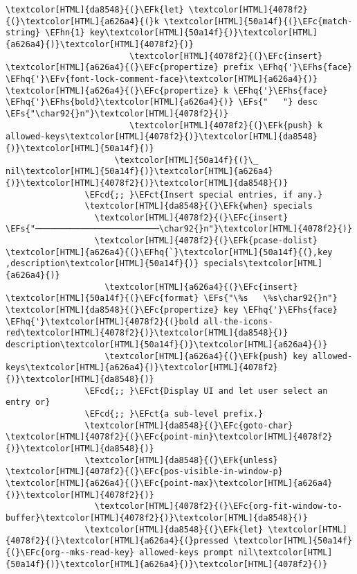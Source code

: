 \documentclass{scrartcl}
\newcommand{\EFk}[1]{\textcolor{EFk}{#1}} %
\newcommand{\EFs}[1]{\textcolor{EFs}{#1}} %
\newcommand{\EFct}[1]{\textcolor{EFct}{#1}} %
\newcommand{\EFc}[1]{\textcolor{EFc}{#1}} %
\newcommand{\EFv}[1]{\textcolor{EFv}{#1}} %
\newcommand{\EFcd}[1]{\textcolor{EFcd}{#1}} %
\newcommand{\EFhn}[1]{\textcolor{EFhn}{\textbf{#1}}} %
\newcommand{\EFhq}[1]{\textcolor{EFhq}{#1}} %
\newcommand{\EFhs}[1]{\textcolor{EFhs}{#1}} %
\begin{document}
\begin{Code}
\begin{Verbatim}[]
                       \textcolor[HTML]{da8548}{(}\EFk{let} \textcolor[HTML]{4078f2}{(}\textcolor[HTML]{a626a4}{(}k \textcolor[HTML]{50a14f}{(}\EFc{match-string} \EFhn{1} key\textcolor[HTML]{50a14f}{)}\textcolor[HTML]{a626a4}{)}\textcolor[HTML]{4078f2}{)}
                         \textcolor[HTML]{4078f2}{(}\EFc{insert} \textcolor[HTML]{a626a4}{(}\EFc{propertize} prefix \EFhq{'}\EFhs{face} \EFhq{'}\EFv{font-lock-comment-face}\textcolor[HTML]{a626a4}{)} \textcolor[HTML]{a626a4}{(}\EFc{propertize} k \EFhq{'}\EFhs{face} \EFhq{'}\EFhs{bold}\textcolor[HTML]{a626a4}{)} \EFs{"   "} desc \EFs{"\char92{}n"}\textcolor[HTML]{4078f2}{)}
                         \textcolor[HTML]{4078f2}{(}\EFk{push} k allowed-keys\textcolor[HTML]{4078f2}{)}\textcolor[HTML]{da8548}{)}\textcolor[HTML]{50a14f}{)}
                      \textcolor[HTML]{50a14f}{(}\_ nil\textcolor[HTML]{50a14f}{)}\textcolor[HTML]{a626a4}{)}\textcolor[HTML]{4078f2}{)}\textcolor[HTML]{da8548}{)}
                \EFcd{;; }\EFct{Insert special entries, if any.}
                \textcolor[HTML]{da8548}{(}\EFk{when} specials
                  \textcolor[HTML]{4078f2}{(}\EFc{insert} \EFs{"─────────────────────────\char92{}n"}\textcolor[HTML]{4078f2}{)}
                  \textcolor[HTML]{4078f2}{(}\EFk{pcase-dolist} \textcolor[HTML]{a626a4}{(}\EFhq{`}\textcolor[HTML]{50a14f}{(},key ,description\textcolor[HTML]{50a14f}{)} specials\textcolor[HTML]{a626a4}{)}
                    \textcolor[HTML]{a626a4}{(}\EFc{insert} \textcolor[HTML]{50a14f}{(}\EFc{format} \EFs{"\%s   \%s\char92{}n"} \textcolor[HTML]{da8548}{(}\EFc{propertize} key \EFhq{'}\EFhs{face} \EFhq{'}\textcolor[HTML]{4078f2}{(}bold all-the-icons-red\textcolor[HTML]{4078f2}{)}\textcolor[HTML]{da8548}{)} description\textcolor[HTML]{50a14f}{)}\textcolor[HTML]{a626a4}{)}
                    \textcolor[HTML]{a626a4}{(}\EFk{push} key allowed-keys\textcolor[HTML]{a626a4}{)}\textcolor[HTML]{4078f2}{)}\textcolor[HTML]{da8548}{)}
                \EFcd{;; }\EFct{Display UI and let user select an entry or}
                \EFcd{;; }\EFct{a sub-level prefix.}
                \textcolor[HTML]{da8548}{(}\EFc{goto-char} \textcolor[HTML]{4078f2}{(}\EFc{point-min}\textcolor[HTML]{4078f2}{)}\textcolor[HTML]{da8548}{)}
                \textcolor[HTML]{da8548}{(}\EFk{unless} \textcolor[HTML]{4078f2}{(}\EFc{pos-visible-in-window-p} \textcolor[HTML]{a626a4}{(}\EFc{point-max}\textcolor[HTML]{a626a4}{)}\textcolor[HTML]{4078f2}{)}
                  \textcolor[HTML]{4078f2}{(}\EFc{org-fit-window-to-buffer}\textcolor[HTML]{4078f2}{)}\textcolor[HTML]{da8548}{)}
                \textcolor[HTML]{da8548}{(}\EFk{let} \textcolor[HTML]{4078f2}{(}\textcolor[HTML]{a626a4}{(}pressed \textcolor[HTML]{50a14f}{(}\EFc{org--mks-read-key} allowed-keys prompt nil\textcolor[HTML]{50a14f}{)}\textcolor[HTML]{a626a4}{)}\textcolor[HTML]{4078f2}{)}

\end{Verbatim}
\end{Code}
\end{document}
